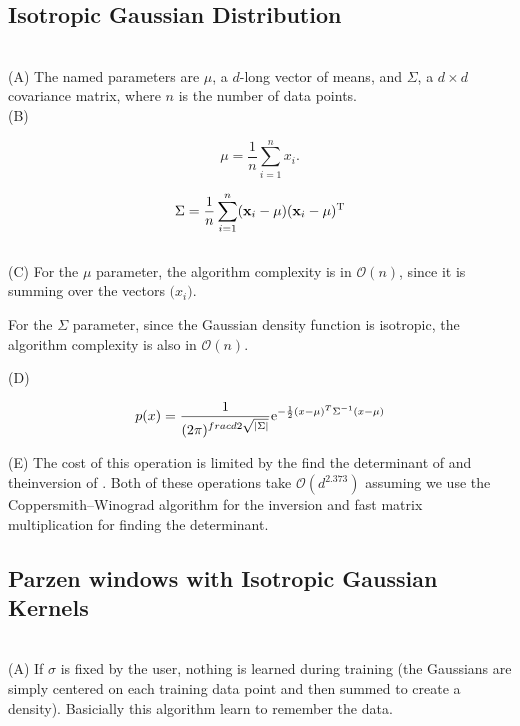 \documentclass{amsart}
\theoremstyle{definition}
\theoremstyle{remark}
\numberwithin{equation}{section}
\begin{document}
\subsection{Isotropic Gaussian Distribution} \\

(A) The named parameters are $\mu$, a $d$-long vector of means, and $\Sigma$, a 
$d \times d$ covariance matrix, where $n$ is the number of data points. \\

(B) 

\begin{equation}
    \mu = \frac{1}{n}\sum_{i=1}^{n}x_{i}.
\end{equation}

\begin{equation}
    \Sigma = {1 \over {n}}\sum_{i=1}^n (\mathbf{x}_i-\mu) (\mathbf{x}_i-\mu)^\mathrm{T}
\end{equation} \\

(C) For the $\mathcal{\mu}$ parameter, the algorithm complexity is in $\mathcal{O}(n)$, since it is summing over the vectors $\mathcal (x_{i})$.

For the  $\Sigma$ parameter, since the Gaussian density function is isotropic, the algorithm complexity is also in $\mathcal{O}(n)$. 


(D)

\begin{equation}
    p(x) = \frac{1}{(2\pi)^{frac{d}{2} \sqrt{|\Sigma|}}} {\rm e}^{-\frac{1}{2}(x-\mu)^T \Sigma^{-1} (x-\mu)}   
\end{equation}
 
(E) The cost of this operation is limited by the find the determinant of \Sigma
and theinversion of \Sigma. Both of these operations take $\mathcal{O}(d^{2.373})$  
assuming we use the Coppersmith–Winograd algorithm for the inversion and fast
matrix multiplication for finding the determinant. \\

\subsection{Parzen windows with Isotropic Gaussian Kernels} \\

(A) If $\sigma$ is fixed by the user, nothing is learned during training (the 
Gaussians are simply centered on each training data point and then summed to 
create a density). Basicially this algorithm learn to remember the data. \\
\end{document}
